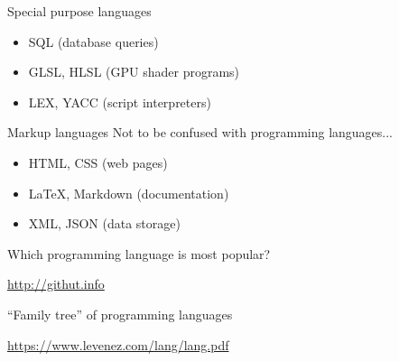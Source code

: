 \begin{frame}{Special purpose languages}
	\begin{itemize}
		\pause\item SQL (database queries)
		\pause\item GLSL, HLSL (GPU shader programs)
		\pause\item LEX, YACC (script interpreters)
	\end{itemize}
\end{frame}

\begin{frame}{Markup languages}
	\pause Not to be confused with programming languages...
	\begin{itemize}
		\pause\item HTML, CSS (web pages)
		\pause\item LaTeX, Markdown (documentation)
		\pause\item XML, JSON (data storage)
	\end{itemize}
\end{frame}

\begin{frame}{Which programming language is most popular?}
	\begin{center}
		\url{http://githut.info}
	\end{center}
\end{frame}

\begin{frame}{``Family tree'' of programming languages}
	\begin{center}
		\url{https://www.levenez.com/lang/lang.pdf}
	\end{center}
\end{frame}
